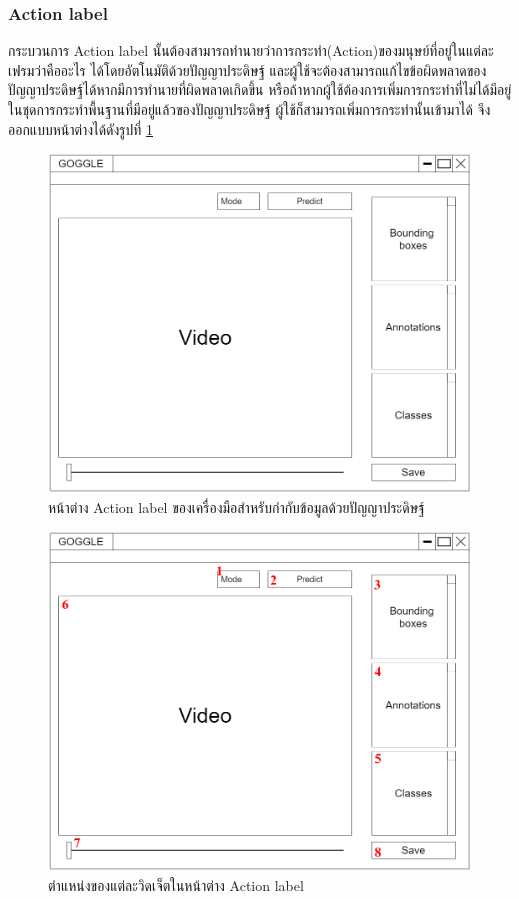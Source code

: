 \subsubsection{Action label}
กระบวนการ Action label นั้นต้องสามารถทำนายว่าการกระทำ(Action)ของมนุษย์ที่อยู่ในแต่ละเฟรมว่าคืออะไร ได้โดยอัตโนมัติด้วยปัญญาประดิษฐ์
และผู้ใช้จะต้องสามารถแก้ไขข้อผิดพลาดของปัญญาประดิษฐ์ได้หากมีการทำนายที่ผิดพลาดเกิดขึ้น
หรือถ้าหากผู้ใช้ต้องการเพิ่มการกระทำที่ไม่ได้มีอยู่ในชุดการกระทำพื้นฐานที่มีอยู่แล้วของปัญญาประดิษฐ์ ผู้ใช้ก็สามารถเพิ่มการกระทำนั้นเข้ามาได้
จึงออกแบบหน้าต่างได้ดังรูปที่ \ref{fig:ActionLabelDraft}
\begin{figure}[!ht]
    \centering
    \includegraphics[width=1\textwidth]{chapter3/images/3_6/ActionLabelDraft.png}
    \caption{หน้าต่าง Action label ของเครื่องมือสำหรับกำกับข้อมูลด้วยปัญญาประดิษฐ์}
    \label{fig:ActionLabelDraft}
\end{figure}
\clearpage
\begin{figure}[!ht]
    \centering
    \includegraphics[width=1\textwidth]{chapter3/images/3_6/ActionLabelDraft_point.png}
    \caption{ตำแหน่งของแต่ละวิดเจ็ตในหน้าต่าง Action label}
    \label{fig:ActiobLabelDraft_point}
\end{figure}
